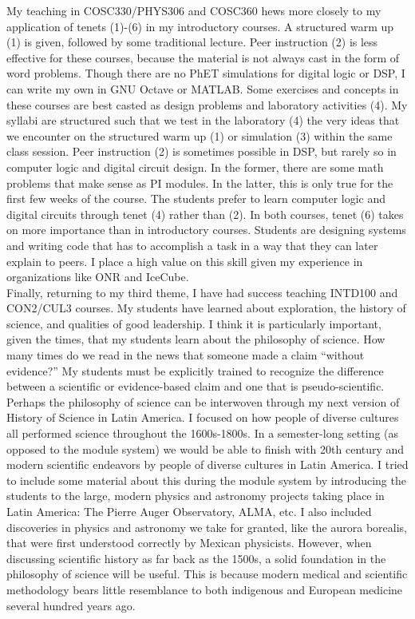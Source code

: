 \documentclass[../../../main.tex]{subfiles}
\begin{document}
My teaching in COSC330/PHYS306 and COSC360 hews more closely to my application of tenets (1)-(6) in my introductory courses.  A structured warm up (1) is given, followed by some traditional lecture.  Peer instruction (2) is less effective for these courses, because the material is not always cast in the form of word problems.  Though there are no PhET simulations for digital logic or DSP, I can write my own in GNU Octave or MATLAB.  Some exercises and concepts in these courses are best casted as design problems and laboratory activities (4).  My syllabi are structured such that we test in the laboratory (4) the very ideas that we encounter on the structured warm up (1) or simulation (3) within the same class session.  Peer instruction (2) is sometimes possible in DSP, but rarely so in computer logic and digital circuit design.  In the former, there are some math problems that make sense as PI modules.  In the latter, this is only true for the first few weeks of the course.  The students prefer to learn computer logic and digital circuits through tenet (4) rather than (2).  In both courses, tenet (6) takes on more importance than in introductory courses.  Students are designing systems and writing code that has to accomplish a task in a way that they can later explain to peers.  I place a high value on this skill given my experience in organizations like ONR and IceCube.
\\
\vspace{0.15cm}
Finally, returning to my third theme, I have had success teaching INTD100 and CON2/CUL3 courses.  My students have learned about exploration, the history of science, and qualities of good leadership.  I think it is particularly important, given the times, that my students learn about the philosophy of science.  How many times do we read in the news that someone made a claim ``without evidence?''  My students must be explicitly trained to recognize the difference between a scientific or evidence-based claim and one that is pseudo-scientific.  Perhaps the philosophy of science can be interwoven through my next version of History of Science in Latin America.  I focused on how people of diverse cultures all performed science throughout the 1600s-1800s.  In a semester-long setting (as opposed to the module system) we would be able to finish with 20th century and modern scientific endeavors by people of diverse cultures in Latin America.  I tried to include some material about this during the module system by introducing the students to the large, modern physics and astronomy projects taking place in Latin America: The Pierre Auger Observatory, ALMA, etc.  I also included discoveries in physics and astronomy we take for granted, like the aurora borealis, that were first understood correctly by Mexican physicists.  However, when discussing scientific history as far back as the 1500s, a solid foundation in the philosophy of science will be useful.  This is because modern medical and scientific methodology bears little resemblance to both indigenous and European medicine several hundred years ago.
\end{document}
